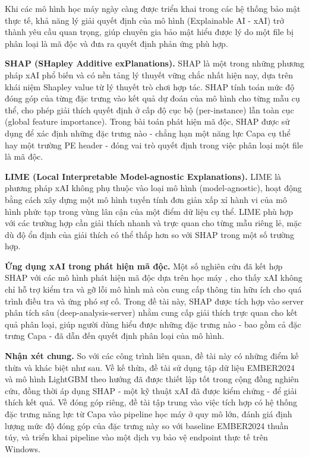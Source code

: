 Khi các mô hình học máy ngày càng được triển khai trong các hệ thống
bảo mật thực tế, khả năng lý giải quyết định của mô hình (Explainable
AI - xAI) trở thành yêu cầu quan trọng, giúp chuyên gia bảo mật
hiểu được lý do một file bị phân loại là mã độc và đưa ra quyết định
phản ứng phù hợp.
 
\textbf{SHAP (SHapley Additive exPlanations).}
SHAP \cite{shap} là một trong những phương pháp xAI phổ biến và có
nền tảng lý thuyết vững chắc nhất hiện nay, dựa trên khái niệm Shapley
value từ lý thuyết trò chơi hợp tác. SHAP tính toán mức độ đóng góp
của từng đặc trưng vào kết quả dự đoán của mô hình cho từng mẫu cụ
thể, cho phép giải thích quyết định ở cấp độ cục bộ (per-instance)
lẫn toàn cục (global feature importance). Trong bài toán phát hiện mã
độc, SHAP được sử dụng để xác định những đặc trưng nào - chẳng hạn
một năng lực Capa cụ thể hay một trường PE header - đóng vai trò
quyết định trong việc phân loại một file là mã độc.
 
\textbf{LIME (Local Interpretable Model-agnostic Explanations).}
LIME \cite{lime} là phương pháp xAI không phụ thuộc vào loại mô hình
(model-agnostic), hoạt động bằng cách xây dựng một mô hình tuyến tính
đơn giản xấp xỉ hành vi của mô hình phức tạp trong vùng lân cận của
một điểm dữ liệu cụ thể. LIME phù hợp với các trường hợp cần giải
thích nhanh và trực quan cho từng mẫu riêng lẻ, mặc dù độ ổn định
của giải thích có thể thấp hơn so với SHAP trong một số trường hợp.
 
\textbf{Ứng dụng xAI trong phát hiện mã độc.}
Một số nghiên cứu đã kết hợp SHAP với các mô hình phát hiện mã độc
dựa trên học máy \cite{shap_malware}, cho thấy xAI không chỉ hỗ trợ
kiểm tra và gỡ lỗi mô hình mà còn cung cấp thông tin hữu ích cho quá
trình điều tra và ứng phó sự cố. Trong đề tài này, SHAP được tích hợp
vào server phân tích sâu (deep-analysis-server) nhằm cung cấp giải
thích trực quan cho kết quả phân loại, giúp người dùng hiểu được
những đặc trưng nào - bao gồm cả đặc trưng Capa - đã dẫn đến
quyết định phân loại của mô hình.

\textbf{Nhận xét chung.}
So với các công trình liên quan, đề tài này có những điểm kế thừa và
khác biệt như sau. Về kế thừa, đề tài sử dụng tập dữ liệu EMBER2024
và mô hình LightGBM theo hướng đã được thiết lập tốt trong cộng đồng
nghiên cứu, đồng thời áp dụng SHAP - một kỹ thuật xAI đã được kiểm
chứng - để giải thích kết quả. Về đóng góp riêng, đề tài tập trung
vào việc tích hợp có hệ thống đặc trưng năng lực từ Capa vào pipeline
học máy ở quy mô lớn, đánh giá định lượng mức độ đóng góp của đặc
trưng này so với baseline EMBER2024 thuần túy, và triển khai
pipeline vào một dịch vụ bảo vệ endpoint thực tế trên Windows.
 









